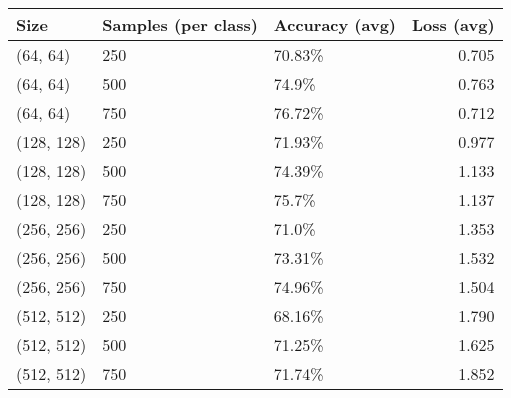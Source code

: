 \begin{tabular}{lllr}
\toprule
      Size & Samples (per class) & Accuracy (avg) &  Loss (avg) \\
\midrule
  (64, 64) &                 250 &         70.83\% &       0.705 \\
  (64, 64) &                 500 &          74.9\% &       0.763 \\
  (64, 64) &                 750 &         76.72\% &       0.712 \\
(128, 128) &                 250 &         71.93\% &       0.977 \\
(128, 128) &                 500 &         74.39\% &       1.133 \\
(128, 128) &                 750 &          75.7\% &       1.137 \\
(256, 256) &                 250 &          71.0\% &       1.353 \\
(256, 256) &                 500 &         73.31\% &       1.532 \\
(256, 256) &                 750 &         74.96\% &       1.504 \\
(512, 512) &                 250 &         68.16\% &       1.790 \\
(512, 512) &                 500 &         71.25\% &       1.625 \\
(512, 512) &                 750 &         71.74\% &       1.852 \\
\bottomrule
\end{tabular}
